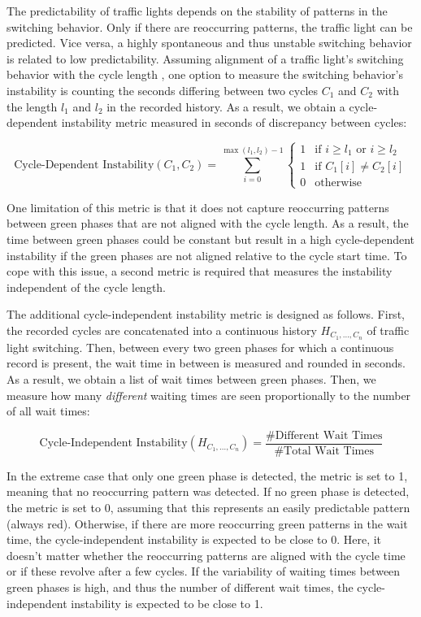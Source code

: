 The predictability of traffic lights depends on the stability of patterns in the switching behavior. Only if there are reoccurring patterns, the traffic light can be predicted. Vice versa, a highly spontaneous and thus unstable switching behavior is related to low predictability. Assuming alignment of a traffic light's switching behavior with the cycle length \cite{protschky_extensive_2014}, one option to measure the switching behavior's instability is counting the seconds differing between two cycles $C_1$ and $C_2$ with the length $l_1$ and $l_2$ in the recorded history. As a result, we obtain a cycle-dependent instability metric measured in seconds of discrepancy between cycles:

\begin{equation} \text{Cycle-Dependent Instability}(C_1, C_2) =  \sum_{i=0}^{\max(l_1, l_2)-1} \left\{
\begin{array}{ll}
1 & \text{if } i \geq l_1 \text{ or } i \geq l_2 \\
1 & \text{if } C_1[i] \neq C_2[i] \\
0 & \text{otherwise}
\end{array} \right.\end{equation}

One limitation of this metric is that it does not capture reoccurring patterns between green phases that are not aligned with the cycle length. As a result, the time between green phases could be constant but result in a high cycle-dependent instability if the green phases are not aligned relative to the cycle start time. To cope with this issue, a second metric is required that measures the instability independent of the cycle length. 

The additional cycle-independent instability metric is designed as follows. First, the recorded cycles are concatenated into a continuous history $H_{C_1, \dots, C_n}$ of traffic light switching. Then, between every two green phases for which a continuous record is present, the wait time in between is measured and rounded in seconds. As a result, we obtain a list of wait times between green phases. Then, we measure how many \textit{different} waiting times are seen proportionally to the number of all wait times:

\begin{equation}
\text{Cycle-Independent Instability}(H_{C_1, \dots, C_n}) = \frac{\text{\# Different Wait Times}}{\text{\# Total Wait Times}}
\end{equation}

In the extreme case that only one green phase is detected, the metric is set to 1, meaning that no reoccurring pattern was detected. If no green phase is detected, the metric is set to 0, assuming that this represents an easily predictable pattern (always red). Otherwise, if there are more reoccurring green patterns in the wait time, the cycle-independent instability is expected to be close to 0. Here, it doesn't matter whether the reoccurring patterns are aligned with the cycle time or if these revolve after a few cycles. If the variability of waiting times between green phases is high, and thus the number of different wait times, the cycle-independent instability is expected to be close to 1. 


